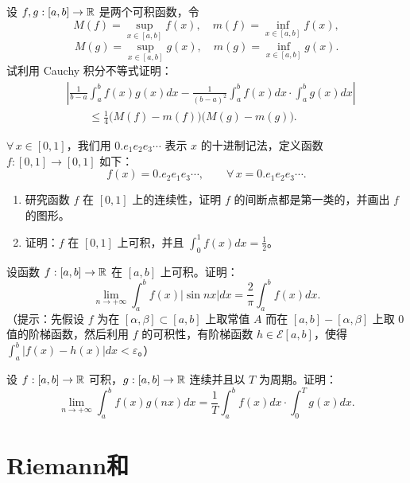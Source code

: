 \begin{exercise}
	\item 设 \(f,g:[a,b]\to\mathbb{R}\) 是两个可积函数，令
	\[
	M(f)=\sup_{x\in[a,b]}f(x),\quad m(f)=\inf_{x\in[a,b]}f(x),
	\]
	\[
	M(g)=\sup_{x\in[a,b]}g(x),\quad m(g)=\inf_{x\in[a,b]}g(x).
	\]
	试利用 Cauchy 积分不等式证明：
	\[
	\begin{aligned}
	&\left|\frac1{b-a}\int_a^b f(x)g(x)dx-\frac1{(b-a)^2}\int_a^b f(x)dx\cdot\int_a^b g(x)dx\right|\\
	&\qquad\le\frac14\bigl(M(f)-m(f)\bigr)\bigl(M(g)-m(g)\bigr).
	\end{aligned}
	\]
\end{exercise}

\begin{exercise}
	\item \(\forall\,x\in[0,1]\)，我们用 \(0.e_1e_2e_3\cdots\) 表示 \(x\) 的十进制记法，定义函数 \(f:[0,1]\to[0,1]\) 如下：
	\[
	f(x)=0.e_2e_1e_3\cdots,\qquad\forall\,x=0.e_1e_2e_3\cdots.
	\]
	\begin{enumerate}[label=\arabic*)]
		\item 研究函数 \(f\) 在 \([0,1]\) 上的连续性，证明 \(f\) 的间断点都是第一类的，并画出 \(f\) 的图形。
		\item 证明：\(f\) 在 \([0,1]\) 上可积，并且 \(\displaystyle\int_0^1 f(x)dx=\frac12\)。
	\end{enumerate}
\end{exercise}

\begin{exercise}
	\item 设函数 \(f:[a,b]\to\mathbb{R}\) 在 \([a,b]\) 上可积。证明：
	\[
	\lim_{n\to+\infty}\int_a^b f(x)|\sin nx|dx=\frac2\pi\int_a^b f(x)dx.
	\]
	（提示：先假设 \(f\) 为在 \([\alpha,\beta]\subset[a,b]\) 上取常值 \(A\) 而在 \([a,b]-[\alpha,\beta]\) 上取 \(0\) 值的阶梯函数，然后利用 \(f\) 的可积性，有阶梯函数 \(h\in\mathscr{E}[a,b]\)，使得 \(\displaystyle\int_a^b|f(x)-h(x)|dx<\varepsilon\)。）
\end{exercise}

\begin{exercise}
	\item 设 \(f:[a,b]\to\mathbb{R}\) 可积，\(g:[a,b]\to\mathbb{R}\) 连续并且以 \(T\) 为周期。证明：
	\[
	\lim_{n\to+\infty}\int_a^b f(x)g(nx)dx=\frac1T\int_a^b f(x)dx\cdot\int_0^T g(x)dx.
	\]
\end{exercise}

\section{Riemann和}

